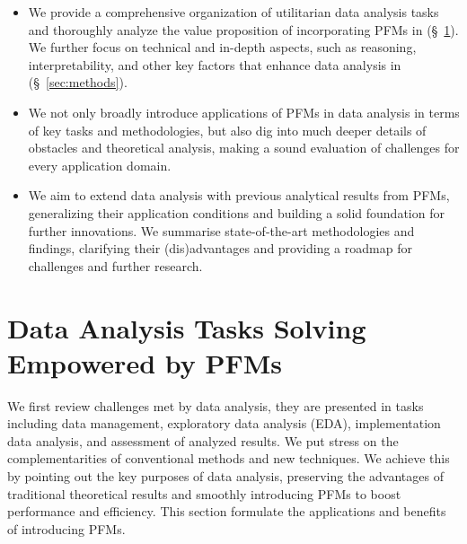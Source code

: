   \begin{itemize}
      \item We provide a comprehensive organization of utilitarian data analysis tasks and thoroughly analyze the value proposition of incorporating PFMs in (\S~\ref{sec:task_solving}). We further focus on technical and in-depth aspects, such as reasoning, interpretability, and other key factors that enhance data analysis in (\S~\ref{sec:methods}).
      
      \item We not only broadly introduce applications of PFMs in data analysis in terms of key tasks and methodologies, but also dig into much deeper details of obstacles and theoretical analysis, making a sound evaluation of challenges for every application domain.
      
      \item We aim to extend data analysis with previous analytical results from PFMs, generalizing their application conditions and building a solid foundation for further innovations. We summarise state-of-the-art methodologies and findings, clarifying their (dis)advantages and providing a roadmap for challenges and further research.
  
  \end{itemize}
  
  
  
  
  \section{Data Analysis Tasks Solving Empowered by PFMs}\label{sec:task_solving}
  
  We first review challenges met by data analysis, they are presented in tasks including data management, exploratory data analysis (EDA), implementation data analysis, and assessment of analyzed results. We put stress on the complementarities of conventional methods and new techniques. We achieve this by pointing out the key purposes of data analysis, preserving the advantages of traditional theoretical results and smoothly introducing PFMs to boost performance and efficiency. This section formulate the applications and benefits of introducing PFMs.
  
  
  \vspace{1cm} %
  \newlength{\leftParentNodeWidth}
  \setlength{\leftParentNodeWidth}{3cm} %
  
